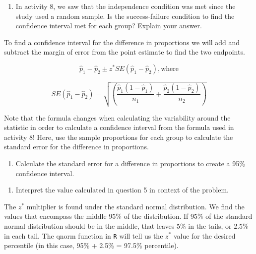 \documentclass[
]{report}
\providecommand{\tightlist}{%
  \setlength{\itemsep}{0pt}\setlength{\parskip}{0pt}}
\begin{document}
\begin{enumerate}
\def\labelenumi{\arabic{enumi}.}
\setcounter{enumi}{3}
\tightlist
\item
  In activity 8, we saw that the independence condition was met since the study used a random sample. Is the success-failure condition to find the confidence interval met for each group? Explain your answer.
\end{enumerate}

\vspace{1in}

To find a confidence interval for the difference in proportions we will add and subtract the margin of error from the point estimate to find the two endpoints.

\[\hat{p}_1-\hat{p}_2\pm z^*SE(\hat{p}_1-\hat{p}_2), \text{where}\]

\[SE(\hat{p}_1-\hat{p}_2) = \sqrt{\left(\frac{\hat{p}_1 (1-\hat{p}_1)}{n_1}+\frac{\hat{p}_2 (1-\hat{p}_2)}{n_2}\right)}\]

Note that the formula changes when calculating the variability around the statistic in order to calculate a confidence interval from the formula used in activity 8! Here, use the sample proportions for each group to calculate the standard error for the difference in proportions.

\begin{enumerate}
\def\labelenumi{\arabic{enumi}.}
\setcounter{enumi}{4}
\tightlist
\item
  Calculate the standard error for a difference in proportions to create a 95\% confidence interval.
\end{enumerate}

\vspace{1in}

\begin{enumerate}
\def\labelenumi{\arabic{enumi}.}
\setcounter{enumi}{5}
\tightlist
\item
  Interpret the value calculated in question 5 in context of the problem.
\end{enumerate}

\vspace{1in}

The \(z^*\) multiplier is found under the standard normal distribution. We find the values that encompass the middle 95\% of the distribution. If 95\% of the standard normal distribution should be in the middle, that leaves 5\% in the tails, or 2.5\% in each tail. The qnorm function in \texttt{R} will tell us the \(z^*\) value for the desired percentile (in this case, 95\% + 2.5\% = 97.5\% percentile).
\end{document}

